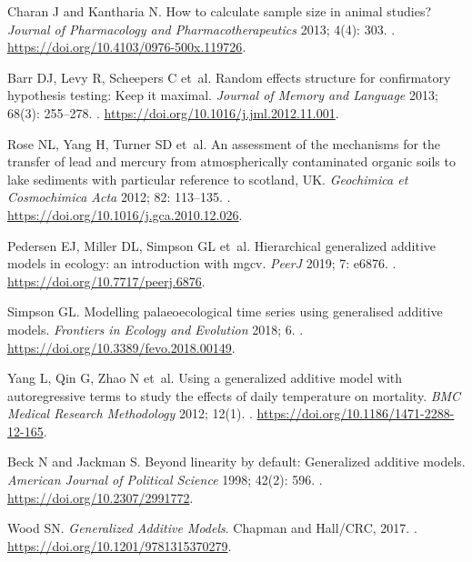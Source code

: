 \documentclass[Royal,times,doublespace,sagev]{sagej}
\begin{document}
\begin{thebibliography}{10}
Charan J and Kantharia N.
\newblock How to calculate sample size in animal studies?
\newblock \emph{Journal of Pharmacology and Pharmacotherapeutics} 2013; 4(4):
  303.
\newblock {}.
\newblock \urlprefix\url{https://doi.org/10.4103/0976-500x.119726}.

Barr DJ, Levy R, Scheepers C et~al.
\newblock Random effects structure for confirmatory hypothesis testing: Keep it
  maximal.
\newblock \emph{Journal of Memory and Language} 2013; 68(3): 255--278.
\newblock {}.
\newblock \urlprefix\url{https://doi.org/10.1016/j.jml.2012.11.001}.

Rose NL, Yang H, Turner SD et~al.
\newblock An assessment of the mechanisms for the transfer of lead and mercury
  from atmospherically contaminated organic soils to lake sediments with
  particular reference to scotland, {UK}.
\newblock \emph{Geochimica et Cosmochimica Acta} 2012; 82: 113--135.
\newblock {}.
\newblock \urlprefix\url{https://doi.org/10.1016/j.gca.2010.12.026}.

Pedersen EJ, Miller DL, Simpson GL et~al.
\newblock Hierarchical generalized additive models in ecology: an introduction
  with mgcv.
\newblock \emph{{PeerJ}} 2019; 7: e6876.
\newblock {}.
\newblock \urlprefix\url{https://doi.org/10.7717/peerj.6876}.

Simpson GL.
\newblock Modelling palaeoecological time series using generalised additive
  models.
\newblock \emph{Frontiers in Ecology and Evolution} 2018; 6.
\newblock {}.
\newblock \urlprefix\url{https://doi.org/10.3389/fevo.2018.00149}.

Yang L, Qin G, Zhao N et~al.
\newblock Using a generalized additive model with autoregressive terms to study
  the effects of daily temperature on mortality.
\newblock \emph{{BMC} Medical Research Methodology} 2012; 12(1).
\newblock {}.
\newblock \urlprefix\url{https://doi.org/10.1186/1471-2288-12-165}.

Beck N and Jackman S.
\newblock Beyond linearity by default: Generalized additive models.
\newblock \emph{American Journal of Political Science} 1998; 42(2): 596.
\newblock {}.
\newblock \urlprefix\url{https://doi.org/10.2307/2991772}.

Wood SN.
\newblock \emph{Generalized Additive Models}.
\newblock Chapman and Hall/{CRC}, 2017.
\newblock {}.
\newblock \urlprefix\url{https://doi.org/10.1201/9781315370279}.


\end{thebibliography}
\end{document}
